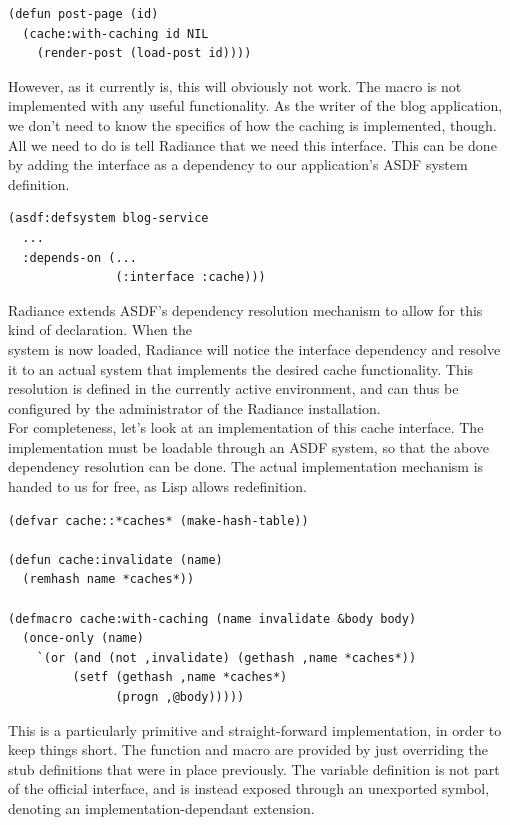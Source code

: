 \documentclass{sig-alternate}
\begin{document}
\begin{verbatim}
(defun post-page (id)
  (cache:with-caching id NIL
    (render-post (load-post id))))
\end{verbatim}

However, as it currently is, this will obviously not work. The  macro is not implemented with any useful functionality. As the writer of the blog application, we don't need to know the specifics of how the caching is implemented, though. All we need to do is tell Radiance that we need this interface. This can be done by adding the interface as a dependency to our application's ASDF\cite{asdf} system definition.

\begin{verbatim}
(asdf:defsystem blog-service
  ...
  :depends-on (...
               (:interface :cache)))
\end{verbatim}

Radiance extends ASDF's dependency resolution mechanism to allow for this kind of declaration. When the \\ system is now loaded, Radiance will notice the interface dependency and resolve it to an actual system that implements the desired cache functionality. This resolution is defined in the currently active environment, and can thus be configured by the administrator of the Radiance installation. \\

For completeness, let's look at an implementation of this cache interface. The implementation must be loadable through an ASDF system, so that the above dependency resolution can be done. The actual implementation mechanism is handed to us for free, as Lisp allows redefinition.

\begin{verbatim}
(defvar cache::*caches* (make-hash-table))

(defun cache:invalidate (name)
  (remhash name *caches*))

(defmacro cache:with-caching (name invalidate &body body)
  (once-only (name)
    `(or (and (not ,invalidate) (gethash ,name *caches*))
         (setf (gethash ,name *caches*)
               (progn ,@body)))))
\end{verbatim}

This is a particularly primitive and straight-forward implementation, in order to keep things short. The function and macro are provided by just overriding the stub definitions that were in place previously. The variable definition is not part of the official interface, and is instead exposed through an unexported symbol, denoting an implementation-dependant extension. \\
\end{document}
